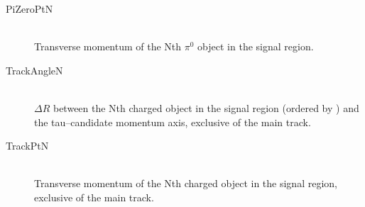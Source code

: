 \begin{description}
  \item[PiZeroPtN] \hfill \\
  Transverse momentum of the Nth $\pi^0$ object in the signal region.

  \item[TrackAngleN] \hfill \\
  $\Delta R$ between the Nth charged object in the signal region (ordered by \pt) and
    the tau--candidate momentum axis, exclusive of the main track.

  \item[TrackPtN] \hfill \\
  Transverse momentum of the Nth charged object in the signal region, exclusive of the 
    main track.

\end{description}
    

